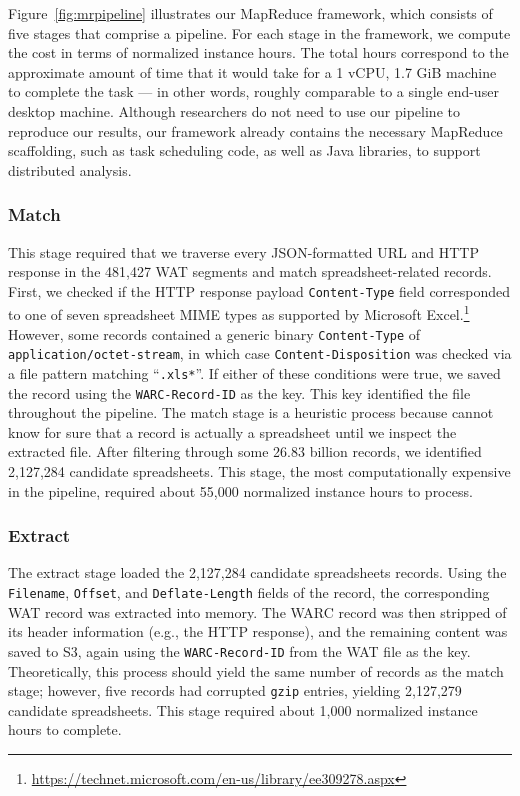 \documentclass[conference]{IEEEtran}
\begin{document}
Figure~\ref{fig:mrpipeline} illustrates our MapReduce framework, which consists of five stages that comprise a pipeline. For each stage in the framework, we compute the cost in terms of normalized instance hours. The total hours correspond to the approximate amount of time that it would take for a 1 vCPU, 1.7 GiB machine to complete the task --- in other words, roughly comparable to a single end-user desktop machine.  Although researchers do not need to use our pipeline to reproduce our results, our framework already contains the necessary MapReduce scaffolding, such as task scheduling code, as well as Java libraries, to support distributed analysis.

\subsubsection{Match} 

This stage required that we traverse every JSON-formatted URL and HTTP response in the 481,427 WAT segments and match spreadsheet-related records. First, we checked if the HTTP response payload \texttt{Content-Type} field corresponded to one of seven spreadsheet MIME types as supported by Microsoft Excel.\footnote{\url{https://technet.microsoft.com/en-us/library/ee309278.aspx}} However, some records contained a generic binary \texttt{Content-Type} of \texttt{application/octet-stream}, in which case \texttt{Content-Disposition} was checked via a file pattern matching ``\texttt{.xls*}''. If either of these conditions were true, we saved the record using the \texttt{WARC-Record-ID} as the key. This key identified the file throughout the pipeline. The match stage is a heuristic process because cannot know for sure that a record is actually a spreadsheet until we inspect the extracted file.  After filtering through some 26.83 billion records, we identified 2,127,284 candidate spreadsheets. This stage, the most computationally expensive in the pipeline, required about 55,000 normalized instance hours to process.

\subsubsection{Extract} 

The extract stage loaded the 2,127,284 candidate spreadsheets records. Using the \texttt{Filename}, \texttt{Offset}, and \texttt{Deflate-Length} fields of the record, the corresponding WAT record was extracted into memory. The WARC record was then stripped of its header information (e.g., the HTTP response), and the remaining content was saved to S3, again using the \texttt{WARC-Record-ID} from the WAT file as the key. Theoretically, this process should yield the same number of records as the match stage; however, five records had corrupted \texttt{gzip} entries, yielding 2,127,279 candidate spreadsheets. This stage required about 1,000 normalized instance hours to complete.
\end{document}

